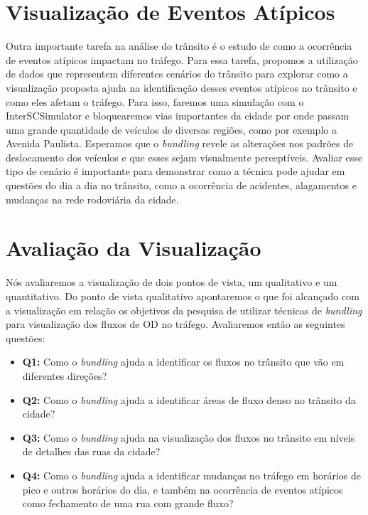 \section{Visualização de Eventos Atípicos}

  Outra importante tarefa na análise do trânsito é o estudo de como a
ocorrência de eventos atípicos impactam no tráfego. Para essa tarefa, propomos
a utilização de dados que representem diferentes cenários do trânsito para
explorar como a visualização proposta ajuda na identificação desses eventos
atípicos no trânsito e como eles afetam o tráfego. Para isso, faremos uma
simulação com o InterSCSimulator e bloquearemos vias importantes da cidade por
onde passam uma grande quantidade de veículos de diversas regiões, como por
exemplo a Avenida Paulista. Esperamos que o \emph{bundling} revele as alterações nos
padrões de deslocamento dos veículos e que esses sejam visualmente
perceptíveis. Avaliar esse tipo de cenário é importante para demonstrar como a
técnica pode ajudar em questões do dia a dia no trânsito, como a ocorrência de
acidentes, alagamentos e mudanças na rede rodoviária da cidade.

\section{Avaliação da Visualização}
  Nós avaliaremos a visualização de dois pontos de vista, um qualitativo e um
quantitativo. Do ponto de vista qualitativo apontaremos o que foi alcançado com
a visualização em relação os objetivos da pesquisa de utilizar técnicas de \emph{bundling}
para visualização dos fluxos de OD no tráfego. Avaliaremos então as seguintes questões:

\begin{itemize}
  \item \textbf{Q1:} Como o \emph{bundling}  ajuda a identificar os fluxos no trânsito
que vão em diferentes direções?

  \item \textbf{Q2:} Como o \emph{bundling}  ajuda a identificar áreas de fluxo
denso no trânsito da cidade?

  \item \textbf{Q3:} Como o \emph{bundling} ajuda na visualização dos fluxos no
trânsito em níveis de detalhes das ruas da cidade?

  \item \textbf{Q4:} Como o \emph{bundling} ajuda a identificar mudanças no
tráfego em horários de pico e outros horários do dia, e também na ocorrência de
eventos atípicos como fechamento de uma rua com grande fluxo?
\end{itemize}

